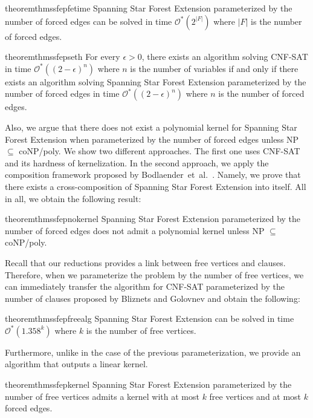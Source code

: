 \documentclass[en]{pracamgr}
\theoremstyle{definition}
\newcommand{\ssfep}{{\sc Spanning Star Forest Extension}}
\newcommand{\cnfsat}{{\sc CNF-SAT}}
\begin{document}
\begin{restatable}{theorem}{thmssfepfetime}\label{thm-ssfep-fe-time}
	\ssfep{} parameterized by the number of forced edges can be solved in time $\mathcal{O}^*(2^{|F|})$ where $|F|$ is the number of forced edges.
\end{restatable}

\begin{restatable}{theorem}{thmssfepseth}\label{thm-ssfep-seth}
	For every $\epsilon > 0$, there exists an algorithm solving \cnfsat{} in time $\mathcal{O}^*((2-\epsilon)^n)$ where $n$ is the number of variables if and only if there exists an algorithm solving \ssfep{} parameterized by the number of forced edges in time $\mathcal{O}^*((2-\epsilon)^n)$ where $n$ is the number of forced edges.
\end{restatable}

\noindent
Also, we argue that there does not exist a polynomial kernel for \ssfep{} when parameterized by the number of forced edges unless NP $\subseteq$ coNP/poly. We show two different approaches. The first one uses \cnfsat{} and its hardness of kernelization. In the second approach, we apply the composition framework proposed by Bodlaender~et~al.~\cite{Bodlaender}. Namely, we prove that there exists a cross-composition of \ssfep{} into itself. All in all, we obtain the following result:

\begin{restatable}{theorem}{thmssfepnokernel}\label{thm-ssfep-nokernel}
	\ssfep{} parameterized by the number of forced edges does not admit a polynomial kernel unless NP $\subseteq$ coNP/poly.
\end{restatable}

Recall that our reductions provides a link between free vertices and clauses. Therefore, when we parameterize the problem by the number of free vertices, we can immediately transfer the algorithm for \cnfsat{} parameterized by the number of clauses proposed by Bliznets and Golovnev \cite{MAXSAT} and obtain the following:

\begin{restatable}{theorem}{thmssfepfreealg}\label{thm-ssfep-free-alg}
	\ssfep{} can be solved in time $\mathcal{O}^*(1.358^k)$ where $k$ is the number of free vertices.
\end{restatable}

\noindent
Furthermore, unlike in the case of the previous parameterization, we provide an algorithm that outputs a linear kernel.

\begin{restatable}{theorem}{thmssfepkernel}\label{thm-ssfep-kernel}
	\ssfep{} parameterized by the number of free vertices admits a kernel with at most $k$ free vertices and at most $k$ forced edges.
\end{restatable}
\end{document}

